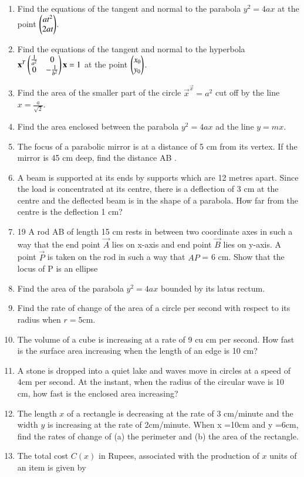 \begin{enumerate}[label=\arabic*.,ref=\thesubsection.\theenumi]
\item Find the equations of the tangent and normal to the parabola 
$y^2 = 4ax$ at the point $\begin{pmatrix}at^2\\2at\end{pmatrix}$.
\item Find the equations of the tangent and normal to the hyperbola 
$
\mathbf{x}^T\begin{pmatrix}\frac{1}{a^2} & 0 \\ 0 & -\frac{1}{b^2}\end{pmatrix}\mathbf{x} = 1
$
at the point $\begin{pmatrix}x_0\\ y_0 \end{pmatrix}$.
\item  Find the area of the smaller part of the circle $\vec{x}^\vec{x}=a^2$ cut off by the line $x = \frac{a}{\sqrt{2}}$.
\item Find the area enclosed between the parabola $y^2=4ax$ ad the line $y = mx$.
\item The focus of a parabolic mirror is at a distance of 5 cm from its vertex. If the mirror is 45 cm deep, find the distance AB .
\item A beam is supported at its ends by  supports which are 12 metres apart. Since the load is concentrated at its centre, there is a deflection of 3 cm at the centre and the deflected beam is in the shape of a parabola. How far from the centre is the deflection 1 cm?
\item 19 A rod AB of length 15 cm rests in between two coordinate axes in such a way that the end point $\vec{A}$ lies on x-axis and end point $\vec{B}$ lies on y-axis. A point $\vec{P}$ is taken on the rod in such a way that $AP$ = 6 cm. Show that the locus of P is an ellipse
%
\item Find the area of the parabola $y^2 = 4ax$ bounded by its latus rectum.
\item Find the rate of change of the area of a circle per second with respect to its radius when $r = 5$cm.
\item The volume of a cube is increasing at a rate of 9 cu cm per second.  How fast is the surface area increasing when the length of an edge is 10 cm?
\item A stone is dropped into a quiet lake and waves move in circles at a speed of 4cm per second. At the instant, when the radius of the circular wave is 10 cm, how fast is the enclosed area increasing?
\item The length $x$ of a rectangle is decreasing at the rate of 3 cm/minute and the width $y$ is increasing at the rate of 2cm/minute. When x =10cm and y =6cm, find the rates of change of (a) the perimeter and (b) the area of the rectangle.
\item The total cost $C(x)$ in Rupees, associated with the production of $x$ units of an item is given by

\end{enumerate}
